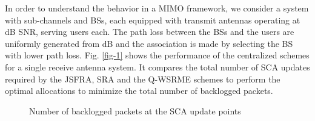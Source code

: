 
In order to understand the behavior in a \ac{MIMO} framework, we consider a system with  sub-channels and  \acp{BS}, each equipped with  transmit antennas operating at dB \ac{SNR}, serving  users each. The path loss between the \acp{BS} and the users are uniformly generated from \me{[0,-3]} dB and the association is made by selecting the \ac{BS} with lower path loss. Fig. \ref{fig-1} shows the performance of the centralized schemes for a single receive antenna system. It compares the total number of \ac{SCA} updates required by the \ac{JSFRA}, \ac{SRA} and the \ac{Q-WSRME} schemes to perform the optimal allocations to minimize the total number of backlogged packets.
\begin{figure*}
\centering
{}
\hfill
{}
\caption{Number of backlogged packets at the \ac{SCA} update points}
\label{fig-a}
\end{figure*}

